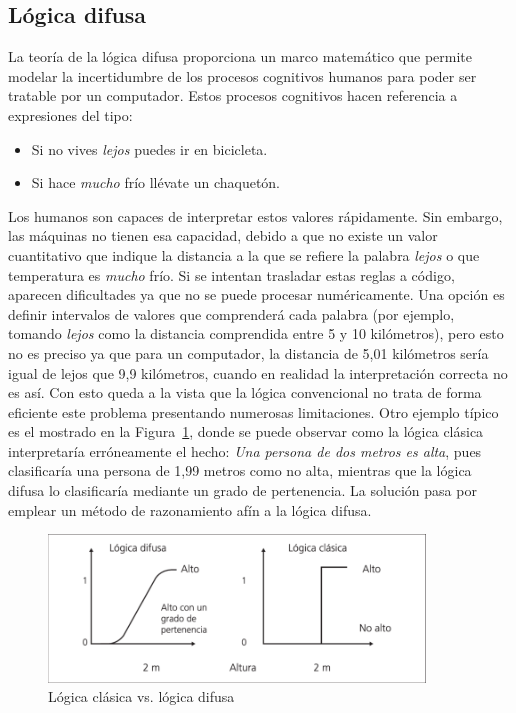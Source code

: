 \subsection{Lógica difusa}
La teoría de la lógica difusa proporciona un marco matemático que permite modelar la incertidumbre de los procesos cognitivos humanos para poder ser tratable por un computador. Estos procesos cognitivos hacen referencia a expresiones del tipo:
\begin{itemize}
	\item Si no vives \textit{lejos} puedes ir en bicicleta.
	\item Si hace \textit{mucho} frío llévate un chaquetón.
\end{itemize}
Los humanos son capaces de interpretar estos valores rápidamente. Sin embargo, las máquinas no tienen esa capacidad, debido a que no existe un valor cuantitativo que indique la distancia a la que se refiere la palabra \textit{lejos} o que temperatura es \textit{mucho} frío. Si se intentan trasladar estas reglas a código, aparecen dificultades ya que no se puede procesar numéricamente. Una opción es definir intervalos de valores que comprenderá cada palabra (por ejemplo, tomando \textit{lejos} como la distancia comprendida entre 5 y 10 kilómetros), pero esto no es preciso ya que para un computador, la distancia de 5,01 kilómetros sería igual de lejos que 9,9 kilómetros, cuando en realidad la interpretación correcta no es así. Con esto queda a la vista que la lógica convencional no trata de forma eficiente este problema presentando numerosas limitaciones. Otro ejemplo típico es el mostrado en la Figura~\ref{fig:ejemplo_logica}, donde se puede observar como la lógica clásica interpretaría erróneamente el hecho: \textit{Una persona de dos metros es alta}, pues clasificaría una persona de 1,99 metros como no alta, mientras que la lógica difusa lo clasificaría mediante un grado de pertenencia. La solución pasa por emplear un método de razonamiento afín a la lógica difusa.\\
\begin{figure}[!h]
	\centering
	\includegraphics[width=10cm]{figs/tipos_logica.png}
	\caption{Lógica clásica vs. lógica difusa}
        \label{fig:ejemplo_logica}
\end{figure}

